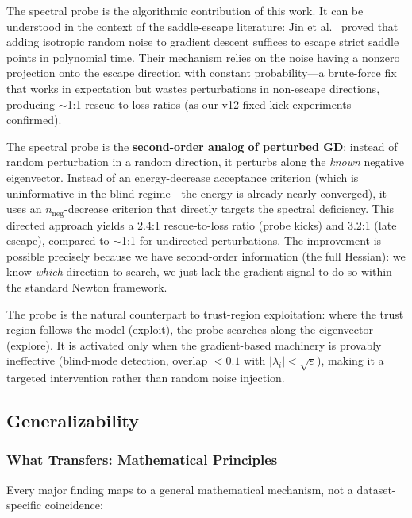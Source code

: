 \documentclass[11pt,a4paper]{article}
\theoremstyle{definition}
\begin{document}
The spectral probe is the algorithmic contribution of this work.  It
can be understood in the context of the saddle-escape literature: Jin
et al.~\citep{jin-perturbed-gd} proved that adding isotropic random
noise to gradient descent suffices to escape strict saddle points in
polynomial time.  Their mechanism relies on the noise having a nonzero
projection onto the escape direction with constant probability---a
brute-force fix that works in expectation but wastes perturbations in
non-escape directions, producing $\sim$1:1 rescue-to-loss ratios (as
our v12 fixed-kick experiments confirmed).

The spectral probe is the \textbf{second-order analog of perturbed GD}:
instead of random perturbation in a random direction, it perturbs along
the \emph{known} negative eigenvector.  Instead of an energy-decrease
acceptance criterion (which is uninformative in the blind regime---the
energy is already nearly converged), it uses an
$n_\text{neg}$-decrease criterion that directly targets the spectral
deficiency.  This directed approach yields a 2.4:1 rescue-to-loss ratio
(probe kicks) and 3.2:1 (late escape), compared to $\sim$1:1 for
undirected perturbations.  The improvement is possible precisely because
we have second-order information (the full Hessian): we know \emph{which}
direction to search, we just lack the gradient signal to do so within the
standard Newton framework.

The probe is the natural counterpart to trust-region exploitation:
where the trust region follows the model (exploit), the probe searches
along the eigenvector (explore).  It is activated only when the
gradient-based machinery is provably ineffective (blind-mode
detection, overlap $<0.1$ with $|\lambda_i|<\sqrt{\varepsilon}$),
making it a targeted intervention rather than random noise injection.

\subsection{Generalizability}
\label{sec:generalizability}

\subsubsection{What Transfers: Mathematical Principles}

Every major finding maps to a general mathematical mechanism, not a
dataset-specific coincidence:
\end{document}
